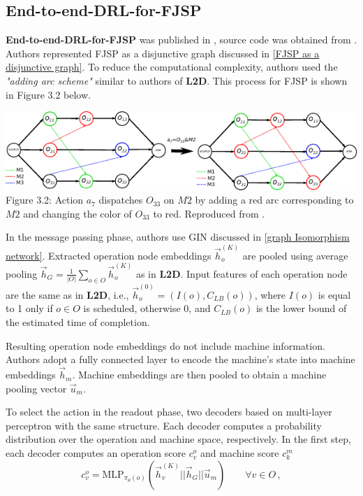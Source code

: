 \subsection{End-to-end-DRL-for-FJSP} 

\textbf{End-to-end-DRL-for-FJSP} was published in \cite{LEI2022117796}, source code was obtained from \cite{github_end_to_end_drl_for_fjsp}. Authors represented FJSP as a disjunctive graph discussed in \ref{FJSP as a disjunctive graph}. To reduce the computational complexity, authors used the \textit{"adding arc scheme"} similar to authors of \textbf{L2D}. This process for FJSP is shown in Figure 3.2 below.
\begin{center}
    \includegraphics[width=\linewidth]{images/fjsp_adding_arcs.pdf}\\
    Figure 3.2: Action $a_7$ dispatches $O_{33}$ on $M2$ by adding a red arc corresponding to $M2$ and changing the color of $O_{33}$ to red. Reproduced from \cite{LEI2022117796}.
\end{center}
In the message passing phase, authors use GIN discussed in \ref{graph Isomorphism network}. Extracted operation node embeddings $\vec{h}_o^{(K)}$ are pooled using average pooling $\vec{h}_G = \frac{1}{|O|} \sum_{o \in O} \vec{h}_o^{(K)}$ as in \textbf{L2D}. Input features of each operation node are the same as in \textbf{L2D}, i.e., $\vec{h}_o^{(0)} = (I(o), C_{LB}(o))$, where $I(o)$ is equal to 1 only if $o \in O$ is scheduled, otherwise 0, and $C_{LB}(o)$ is the lower bound of the estimated time of completion.
\par
Resulting operation node embeddings do not include machine information. Authors adopt a fully connected layer to encode the machine's state into machine embeddings $\vec{h}_m$. Machine embeddings are then pooled to obtain a machine pooling vector $\vec{u}_m$. 
\par
To select the action in the readout phase, two decoders based on multi-layer perceptron with the same structure. Each decoder computes a probability distribution over the operation and machine space, respectively. In the first step, each decoder computes an operation score $c^o_{v}$ and machine score $c^m_{k}$ \cite{LEI2022117796}
\begin{equation}
    c^{o}_v = \text{MLP}_{\pi_{\theta}(o)} \left ( \vec{h}_v^{(K)} || \vec{h}_G || \vec{u}_m \right ) \hspace{2em} \forall v \in O \, ,
\end{equation}
